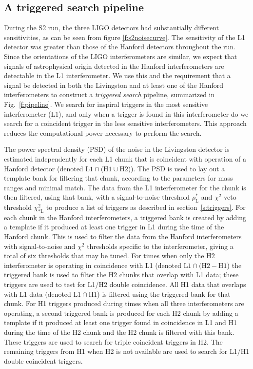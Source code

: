 \subsection{A triggered search pipeline}
\label{ss:triggeredsearch}

During the S2 run, the three LIGO detectors had substantially different
sensitivities, as can be seen from figure \ref{f:s2noisecurve}. The
sensitivity of the L1 detector was greater than those of the Hanford detectors
throughout the run. Since the orientations of the LIGO interferometers are
similar, we expect that signals of astrophysical origin detected in the
Hanford interferometers are detectable in the L1 interferometer.  We use this
and the requirement that a signal be detected in both the Livingston and at
least one of the Hanford interferometers to construct a {\em triggered search}
pipeline, summarized in Fig.~\ref{f:pipeline}. We search for inspiral triggers
in the most sensitive interferometer (L1), and only when a trigger is found in
this interferometer do we search for a coincident trigger in the less
sensitive interferometers. This approach reduces the computational power
necessary to perform the search.


The power spectral density (PSD) of the noise in the Livingston detector is
estimated independently for each L1 chunk that is coincident with operation of
a Hanford detector (denoted $\mathrm{L1} \cap (\mathrm{H1} \cup
\mathrm{H2}$)).  The PSD is used to lay out a template bank for filtering that
chunk, according to the parameters for mass ranges and minimal
match\cite{Owen:1998dk}. The data from the L1 interferometer for the chunk is
then filtered, using that bank, with a signal-to-noise threshold
$\rho_{\mathrm{L}}^\ast$ and $\chi^2$ veto threshold
$\chi^2_{\ast\mathrm{L}}$ to produce a list of triggers as described in
section~\ref{s:triggers}.  For each chunk in the Hanford interferometers, a
{triggered bank} is created by adding a template if it produced at least one
trigger in L1 during the time of the Hanford chunk.  This is used to filter
the data from the Hanford interferometers with signal-to-noise and $\chi^2$
thresholds specific to the interferometer, giving a total of six thresholds
that may be tuned.  For times when only the H2 interferometer is operating in
coincidence with L1 (denoted $\mathrm{L1} \cap (\mathrm{H2} - \mathrm{H1}$)
the triggered bank is used to filter the H2 chunks that overlap with L1 data;
these triggers are used to test for L1/H2 double coincidence.  All H1 data
that overlaps with L1 data (denoted $\mathrm{L1} \cap \mathrm{H1}$) is
filtered using the triggered bank for that chunk. For H1 triggers produced
during times when all three interferometers are operating, a second triggered
bank is produced for each H2 chunk by adding a template if it produced at
least one trigger found in coincidence in L1 and H1 during the time of the H2
chunk and the H2 chunk is filtered with this bank.  These triggers are used to
search for triple coincident triggers in H2.  The remaining triggers from H1
when H2 is not available are used to search for L1/H1 double coincident
triggers.

